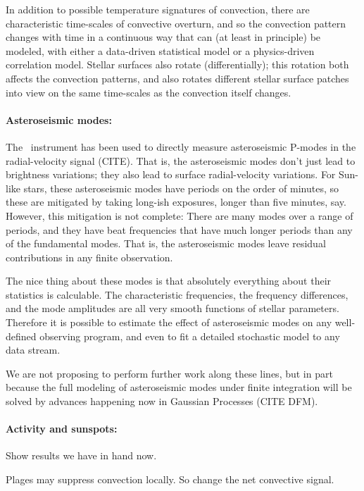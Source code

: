\documentclass[12pt, fullpage, letterpaper]{article}
\begin{document}
In addition to possible temperature signatures of convection, there
are characteristic time-scales of convective overturn, and so the convection
pattern changes with time in a continuous way that can (at least in principle)
be modeled, with either a data-driven statistical model or a physics-driven
correlation model.
Stellar surfaces also rotate (differentially); this rotation both affects
the convection patterns, and also rotates different stellar surface patches
into view on the same time-scales as the convection itself changes.

\paragraph{Asteroseismic modes:}
The \HARPS\ instrument has been used to directly measure asteroseismic
P-modes in the radial-velocity signal (CITE).
That is, the asteroseismic modes don't
just lead to brightness variations; they also lead to surface radial-velocity
variations.
For Sun-like stars, these asteroseismic modes have periods on the order of minutes,
so these are mitigated by taking long-ish exposures, longer than five minutes, say.
However, this mitigation is not complete: There are many modes over a range of periods,
and they have beat frequencies that have much longer periods than any of the fundamental
modes.
That is, the asteroseismic modes leave residual contributions in any finite observation.

The nice thing about these modes is that absolutely everything about their statistics
is calculable.
The characteristic frequencies, the frequency differences, and the mode amplitudes are
all very smooth functions of stellar parameters.
Therefore it is possible to estimate the effect of asteroseismic modes on any well-defined
observing program, and even to fit a detailed stochastic model to any data stream.

We are not proposing to perform further work along these lines, but in part because
the full modeling of asteroseismic modes under finite integration will be solved
by advances happening now in Gaussian Processes (CITE DFM).

\paragraph{Activity and sunspots:}
Show results we have in hand now.

Plages may suppress convection locally. So change the net convective signal.
\end{document}
